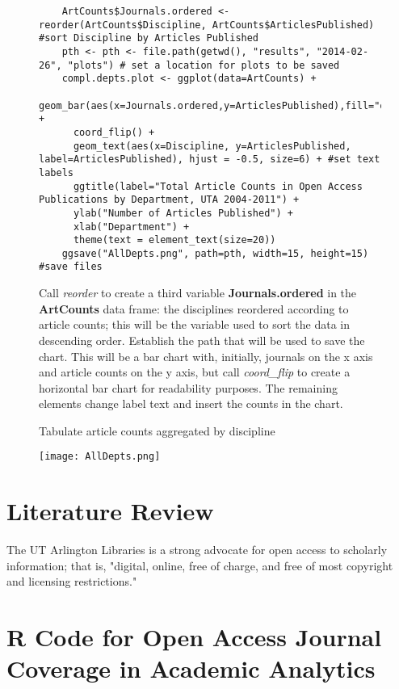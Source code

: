 \documentclass{article}
\begin{document}
\begin{figure}
	\centering
	\begin{lstlisting}
	ArtCounts$Journals.ordered <- reorder(ArtCounts$Discipline, ArtCounts$ArticlesPublished) #sort Discipline by Articles Published
	pth <- pth <- file.path(getwd(), "results", "2014-02-26", "plots") # set a location for plots to be saved
	compl.depts.plot <- ggplot(data=ArtCounts) +
	  geom_bar(aes(x=Journals.ordered,y=ArticlesPublished),fill="orange",color="black",stat="identity") +
	  coord_flip() +
	  geom_text(aes(x=Discipline, y=ArticlesPublished, label=ArticlesPublished), hjust = -0.5, size=6) + #set text labels
	  ggtitle(label="Total Article Counts in Open Access Publications by Department, UTA 2004-2011") +
	  ylab("Number of Articles Published") +
	  xlab("Department") +
	  theme(text = element_text(size=20))
	ggsave("AllDepts.png", path=pth, width=15, height=15) #save files 
	\end{lstlisting}
	\footnotesize{
	Call \textit{reorder} to create a third variable \textbf{Journals.ordered} in the \textbf{ArtCounts} data frame: the disciplines reordered according to article counts; this will be the variable used to sort the data in descending order.
	Establish the path that will be used to save the chart.
	This will be a bar chart with, initially, journals on the x axis and article counts on the y axis, but call \textit{coord\_flip} to create a horizontal bar chart for readability purposes.
	The remaining elements change label text and insert the counts in the chart.
			}
	\caption{Tabulate article counts aggregated by discipline}
\end{figure}
\begin{figure}
	\centering
	\texttt{[image: AllDepts.png]}
	\label{overflow}
\end{figure}
	






\section{Literature Review}
The UT Arlington Libraries is a strong advocate for open access to scholarly information; that is, "digital, online, free of charge, and free of most copyright and licensing restrictions."  \cite{RefWorks:102}













\appendix
\section{R Code for Open Access Journal Coverage in Academic Analytics}
\end{document}
